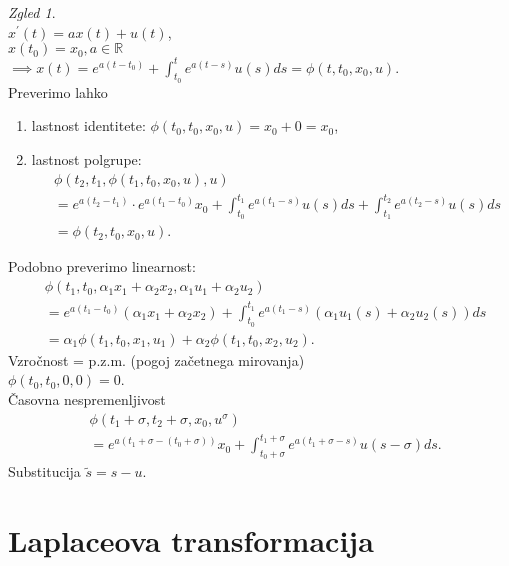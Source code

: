 \documentclass[a4paper, 12pt]{book}
\theoremstyle{definition}
\theoremstyle{remark}
\newtheorem*{exmp}{Zgled}
\newcommand{\R}{\mathbb{R}}
\begin{document}
\begin{exmp} \text{} \\
    $x^{'}(t) = a x(t) + u(t)$, \\
    $x(t_0) = x_0, a \in \R$ \\
    $\implies x(t) = e^{a(t-t_0)} + \int_{t_0}^t e^{a(t-s)} u(s) ds = \phi(t, t_0, x_0, u)$. \\
    Preverimo lahko
    \begin{enumerate}[label=\alph*)]
        \item lastnost identitete: $\phi(t_0, t_0, x_0, u) = x_0 + 0 = x_0$,
        \item lastnost polgrupe:
            \begin{align*}
                &\phi(t_2, t_1, \phi(t_1, t_0, x_0, u), u) \\
                &= e^{a(t_2-t_1)} \cdot e^{a(t_1-t_0)} x_0
                + \int_{t_0}^{t_1} e^{a(t_1-s)} u(s) ds + \int_{t_1}^{t_2} e^{a(t_2-s)} u(s) ds \\
                &= \phi(t_2, t_0, x_0, u).
            \end{align*}
    \end{enumerate}
    Podobno preverimo linearnost:
    \begin{align*}
        &\phi(t_1, t_0, \alpha_1 x_1 + \alpha_2 x_2, \alpha_1 u_1 + \alpha_2 u_2) \\
        &= e^{a(t_1-t_0)}(\alpha_1 x_1 + \alpha_2 x_2) + \int_{t_0}^{t_1} e^{a(t_1-s)} (\alpha_1 u_1(s) + \alpha_2 u_2(s)) ds \\
        &= \alpha_1 \phi(t_1, t_0, x_1, u_1) + \alpha_2 \phi(t_1, t_0, x_2, u_2).
    \end{align*}
    Vzročnost = p.z.m. (pogoj začetnega mirovanja) \\
    $\phi(t_0, t_0, 0, 0) = 0$. \\
    Časovna nespremenljivost
    \begin{align*}
        &\phi(t_1 + \sigma, t_2 + \sigma, x_0, u^{\sigma}) \\
        &= e^{a(t_1+\sigma-(t_0+\sigma))} x_0 + \int_{t_0+\sigma}^{t_1+\sigma} e^{a(t_1+\sigma-s)} u(s-\sigma) ds.
    \end{align*}
    Substitucija $\tilde{s} = s - u$.
\end{exmp}




\section{Laplaceova transformacija}
\end{document}
